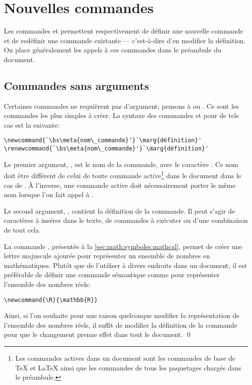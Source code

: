 \section{Nouvelles commandes}
\label{sec:commandes:commandes}

Les commandes \cmd{\newcommand} et \cmd{\renewcommand} permettent
respectivement de définir une nouvelle commande et de redéfinir une
commande existante --- c'est-à-dire d'en modifier la définition. On
place généralement les appels à ces commandes dans le préambule du
document.

\subsection{Commandes sans arguments}
\label{sec:commandes:commandes:sans_arg}

Certaines commandes ne requièrent pas d'argument; pensons à
\cmdprint{\LaTeX} ou \cmdprint{\bfseries}. Ce sont les commandes les
plus simples à créer. La syntaxe des commandes \cmd{\newcommand} et
\cmd{\renewcommand} pour de tels cas est la suivante:
\begin{lstlisting}
\newcommand{`\bs\meta{nom\_commande}'}`\marg{définition}'
\renewcommand{`\bs\meta{nom\_commande}'}`\marg{définition}'
\end{lstlisting}
Le premier argument, \bs{}, est le nom de la
commande, avec le caractère \bs. Ce nom doit être différent de celui
de toute commande active\footnote{%
  Les commandes actives dans un document sont les commandes de base de
  {\TeX} et {\LaTeX} ainsi que les commandes de tous les paquetages
  chargés dans le préambule.} %
dans le document dans le cas de \cmdprint{\newcommand}. À l'inverse,
une commande active doit nécessairement porter le même nom lorsque
l'on fait appel à \cmdprint{\renewcommand}.

Le second argument, , contient la définition de la
commande. Il peut s'agir de caractères à insérer dans le texte, de
commandes à exécuter ou d'une combinaison de tout cela.

\begin{exemple}
  La commande \cmd{\mathbb}, présentée à la
  \autoref{sec:math:symboles:mathcal}, permet de créer une lettre
  majuscule ajourée pour représenter un ensemble de nombres en
  mathématiques. Plutôt que de l'utiliser à divers endroits dans un
  document, il est préférable de définir une commande sémantique comme
  \cmdprint{\R} pour représenter l'ensemble des nombres réels:
\begin{lstlisting}
\newcommand{\R}{\mathbb{R}}
\end{lstlisting}
  Ainsi, si l'on souhaite pour une raison quelconque modifier la
  représentation de l'ensemble des nombres réels, il suffit de
  modifier la définition de la commande \cmdprint{\R} pour que le
  changement prenne effet dans tout le document. %
  \qed
\end{exemple}

